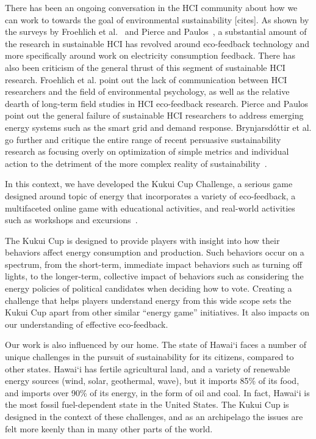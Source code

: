 \documentclass{sigchi}
\begin{document}
There has been an ongoing conversation in the HCI community about how we can work to towards the goal of environmental sustainability [cites]. As shown by the surveys by Froehlich et al.~\cite{Froehlich2010} and Pierce and Paulos~\cite{Pierce2012-BEM}, a substantial amount of the research in sustainable HCI has revolved around eco-feedback technology and more specifically around work on electricity consumption feedback. There has also been criticism of the general thrust of this segment of sustainable HCI research. Froehlich et al. point out the lack of communication between HCI researchers and the field of environmental psychology, as well as the relative dearth of long-term field studies in HCI eco-feedback research. Pierce and Paulos point out the general failure of sustainable HCI researchers to address emerging energy systems such as the smart grid and demand response. Brynjarsd\'{o}ttir et al. go further and critique the entire range of recent persuasive sustainability research as focusing overly on optimization of simple metrics and individual action to the detriment of the more complex reality of sustainability~\cite{Brynjarsdottir2012-unpersuaded}.

In this context, we have developed the Kukui Cup Challenge, a serious game~\cite{Zyda2005} designed around topic of energy that incorporates a variety of eco-feedback, a multifaceted online game with educational activities, and real-world activities such as workshops and excursions~\cite{csdl2-10-07}. 

The Kukui Cup is designed to provide players with insight into how their behaviors affect energy consumption and production.  Such behaviors occur on a spectrum, from the short-term, immediate impact behaviors such as turning off lights, to the longer-term, collective impact of behaviors such as considering the energy policies of political candidates when deciding how to vote.  Creating a challenge that helps players understand energy from this wide scope sets the Kukui Cup apart from other similar ``energy game'' initiatives.  It also impacts on our understanding of effective eco-feedback.

Our work is also influenced by our home.  The state of Hawai`i faces a number of unique challenges in the pursuit of sustainability for its citizens, compared to other states. Hawai`i has fertile 
agricultural land, and a variety of renewable energy sources (wind, solar, geothermal, wave), but it imports 85\% of its food, and imports over 90\% of its energy, in the form of oil and coal. In fact, Hawai`i is the most fossil fuel-dependent state in the United States. The Kukui Cup is designed in the context of these challenges, and as an archipelago the issues are felt more keenly than in many other parts of the world.
\end{document}
